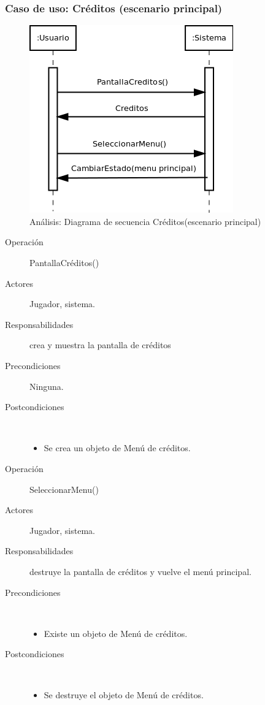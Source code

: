 \subsubsection{Caso de uso: Créditos (escenario principal)}

\begin{figure}[H] 
  \label{secuencia_creditos}
  \begin{center}
    \includegraphics[scale=0.7]{imagenes/analisis/secuencia_creditos.png}
  \end{center}
  \caption{Análisis: Diagrama de secuencia Créditos(escenario principal)}
\end{figure}

\begin{description}
    \item [Operación] PantallaCréditos()
    \item [Actores] Jugador, sistema.
    \item [Responsabilidades] crea y muestra la pantalla de créditos
    \item [Precondiciones] Ninguna.
    \item [Postcondiciones] $\quad$
        \begin{itemize}
            \item Se crea un objeto de Menú de créditos.
        \end{itemize}
\end{description}

\begin{description}
    \item [Operación] SeleccionarMenu()
    \item [Actores] Jugador, sistema.
    \item [Responsabilidades] destruye la pantalla de créditos y vuelve el menú principal.
    \item [Precondiciones] $\quad$
        \begin{itemize}
            \item Existe un objeto de Menú de créditos.
        \end{itemize}
    \item [Postcondiciones] $\quad$
        \begin{itemize}
            \item Se destruye el objeto de Menú de créditos.
        \end{itemize}
\end{description}

